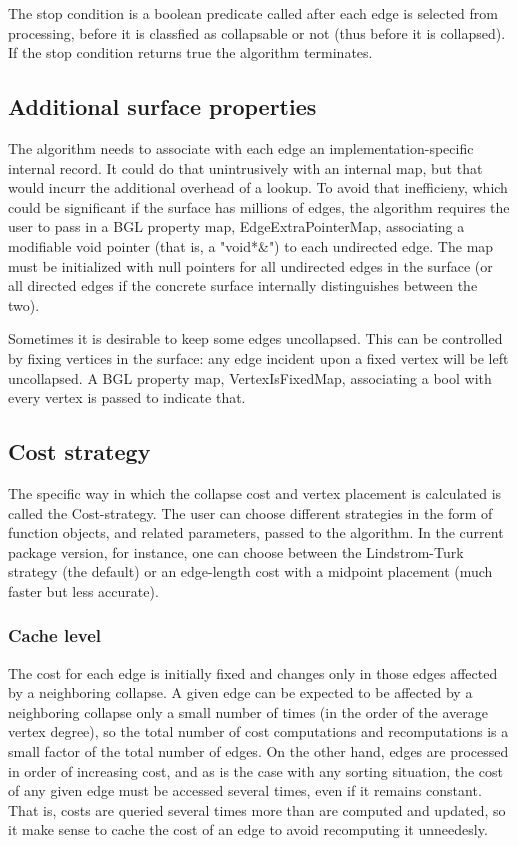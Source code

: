 The stop condition is a boolean predicate called after each edge is selected from processing, before it is classfied as collapsable or not (thus before it is collapsed). If the stop condition returns true the algorithm terminates.

\subsection{Additional surface properties}

The algorithm needs to associate with each edge an implementation-specific internal record. It could do that unintrusively with an internal map, but that would incurr the additional overhead of a lookup. To avoid that inefficieny, which could be significant if the surface has millions of edges, the algorithm requires the user to pass in a BGL property map, EdgeExtraPointerMap, associating a modifiable void pointer (that is, a "void*\&") to each undirected edge. The map must be initialized with null pointers for all undirected edges in the surface (or all directed edges if the concrete surface internally distinguishes between the two). 

Sometimes it is desirable to keep some edges uncollapsed. This can be controlled by fixing vertices in the surface: any edge incident upon a fixed vertex will be left uncollapsed. A BGL property map, VertexIsFixedMap,  associating a bool with every vertex is passed to indicate that.

\subsection{Cost strategy}

The specific way in which the collapse cost and vertex placement is calculated is called the Cost-strategy.
The user can choose different strategies in the form of function objects, and related parameters, passed to the algorithm.
In the current package version, for instance, one can choose between the Lindstrom-Turk strategy (the default) or an edge-length cost with a midpoint placement (much faster but less accurate).

\subsubsection{Cache level}

The cost for each edge is initially fixed and changes only in those edges affected by a neighboring collapse. A given edge can be expected to be affected by a neighboring collapse only a small number of times (in the order of the average vertex degree), so the total number of cost computations and recomputations is a small factor of the total number of edges. On the other hand, edges are processed in order of increasing cost, and as is the case with any sorting situation, the cost of any given edge must be accessed several times, even if it remains constant. That is, costs are queried several times more than are computed and updated, so it make sense to cache the cost of an edge to avoid recomputing it unneedesly.

